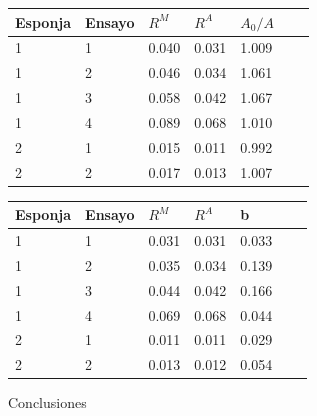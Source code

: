 \documentclass[usenames,dvipsnames]{beamer}
\begin{document}
\begin{frame}

\begin{multicols}{2}
  \begin{table} 
 \tiny
 \begin{center} 
  \begin{tabular}{@{}lllllll@{}} \toprule
  Esponja & Ensayo   &    $R^M$    &  $R^A$ &  $A_0/A$ \\ \midrule
  1   & 1       &  0.040  & 0.031 & 1.009  \\
  1   & 2       &  0.046  & 0.034 &  1.061  \\
  1   & 3       &  0.058  & 0.042 &  1.067  \\
  1   & 4     &  0.089  & 0.068 &  1.010 \\
  2   & 1     &  0.015  & 0.011 &  0.992  \\
  2   & 2    &  0.017  & 0.013 &  1.007   \\
  \bottomrule
  \end{tabular}
\end{center}
  \end{table}




\begin{table} 
\tiny
\begin{center} 
\begin{tabular}{@{}lllllll@{}} \toprule
Esponja &Ensayo   &    $R^M$    &  ${R^A}$ &  b \\ \midrule
1 & 1       &  0.031  & 0.031   & 0.033  \\
1 & 2       &  0.035  & 0.034  &  0.139  \\
1 & 3       &  0.044  & 0.042  &  0.166  \\
1 & 4      &  0.069 &	0.068 &	0.044 \\
2 & 1      &  0.011 &	0.011 & 0.029 \\
2 & 2      &  0.013 &	0.012 & 0.054\\
 \bottomrule

 \end{tabular}

\end{center}
\end{table}

\end{multicols}
\end{frame}


\begin{frame}
 Conclusiones
\end{frame}
\end{document}
